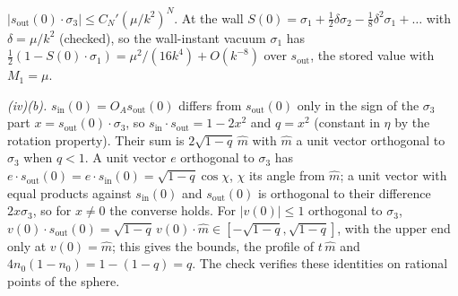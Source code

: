 $|s_{\mathrm{out}}(0)\cdot\sigma_{3}| \le C_{N}'(\mu/k^{2})^{N}$. At the wall $S(0) = \sigma_{1} + \tfrac12\delta\sigma_{2} - \tfrac18\delta^{2}\sigma_{1} + \dots$ with $\delta = \mu/k^{2}$ (checked), so the wall-instant vacuum $\sigma_{1}$ has $\tfrac12(1 - S(0)\cdot\sigma_{1}) = \mu^{2}/(16k^{4}) + O(k^{-8})$ over $s_{\mathrm{out}}$, the stored value with $M_{1} = \mu$.

\emph{(iv)(b).} $s_{\mathrm{in}}(0) = O_{A}s_{\mathrm{out}}(0)$ differs from $s_{\mathrm{out}}(0)$ only in the sign of the $\sigma_{3}$ part $x = s_{\mathrm{out}}(0)\cdot\sigma_{3}$, so $s_{\mathrm{in}}\cdot s_{\mathrm{out}} = 1 - 2x^{2}$ and $q = x^{2}$ (constant in $\eta$ by the rotation property). Their sum is $2\sqrt{1 - q}\,\hat m$ with $\hat m$ a unit vector orthogonal to $\sigma_{3}$ when $q < 1$. A unit vector $e$ orthogonal to $\sigma_{3}$ has $e\cdot s_{\mathrm{out}}(0) = e\cdot s_{\mathrm{in}}(0) = \sqrt{1 - q}\cos\chi$, $\chi$ its angle from $\hat m$; a unit vector with equal products against $s_{\mathrm{in}}(0)$ and $s_{\mathrm{out}}(0)$ is orthogonal to their difference $2x\sigma_{3}$, so for $x \ne 0$ the converse holds. For $|v(0)| \le 1$ orthogonal to $\sigma_{3}$, $v(0)\cdot s_{\mathrm{out}}(0) = \sqrt{1 - q}\,v(0)\cdot\hat m \in [-\sqrt{1 - q}, \sqrt{1 - q}]$, with the upper end only at $v(0) = \hat m$; this gives the bounds, the profile of $t\,\hat m$ and $4n_{0}(1 - n_{0}) = 1 - (1 - q) = q$. The check verifies these identities on rational points of the sphere.

